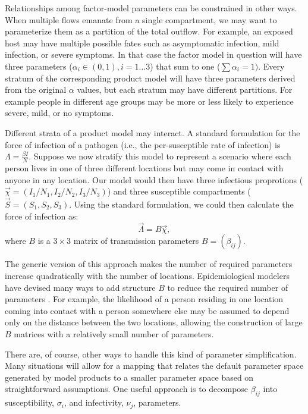 Relationships among factor-model parameters can be constrained in other ways. When multiple flows emanate from a single compartment, we may want to parameterize them as a partition of the total outflow. For example, an exposed host may have multiple possible fates such as asymptomatic infection, mild infection, or severe symptoms. In that case the factor model in question will have three parameters ($\alpha_i \in (0,1), i = 1 \ldots 3$) that sum to one ($\sum \alpha_i = 1)$. Every stratum of the corresponding product model will have three parameters derived from the original $\alpha$ values,  but each stratum may have different partitions. For example people in different age groups may be more or less likely to experience severe, mild, or no symptoms. 

Different strata of a product model may interact.
A standard formulation for the force of infection of a pathogen (i.e., the per-susceptible rate of infection) is
$\Lambda = \frac{\beta I}{N}$. Suppose we now stratify this model to represent a scenario where each person lives in one of three different locations but may come in contact with anyone in any location. Our model would then have three infectious proprotions ($\vec{\chi} = (I_1/N_1, I_2/N_2, I_3/N_3)$) and three susceptible compartments ($\vec{S} = (S_1, S_2, S_3)$.
Using the standard formulation, we could then calculate the force of infection as:
$$
    \vec{\Lambda} =  B \vec{\chi}, 
$$
where $B$ is a $3 \times 3$ matrix of transmission parameters $B = \left(\beta_{ij}\right)$.

The generic version of this approach makes the number of required parameters increase quadratically with the number of locations. Epidemiological modelers have devised many ways to add structure $B$ to reduce the required number of parameters \cite{andemay85, andemaybook, grenande85}. 
For example, the likelihood of a person residing in one location coming into contact with a person somewhere else may be assumed to depend only on the distance between the two locations, allowing the construction of large $B$ matrices with a relatively small number of parameters. 

There are, of course, other ways to handle this kind of parameter simplification. Many situations will allow for a mapping that relates the default parameter space generated by model products to a smaller parameter space based on straightforward assumptions.  One useful approach is to decompose $\beta_{ij}$ into susceptibility, $\sigma_i$, and infectivity, $\nu_j$, parameters.

